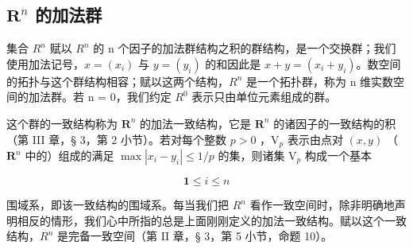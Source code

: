 \subsection{\texorpdfstring{\(\mathbf{R}^n\) 的加法群}{R 的 n 次幂的加法群}}

集合 \(R^{n}\) 赋以 \(R^{n}\) 的 n 个因子的加法群结构之积的群结构，是一个交换群；我们使用加法记号，\(x = (x_{i})\) 与 \(y = (y_{i})\) 的和因此是 \(x + y = (x_{i} + y_{i})\)。数空间的拓扑与这个群结构相容；赋以这两个结构，\(R^{n}\) 是一个拓扑群，称为 n 维实数空间的加法群。若 n = 0，我们约定 \(R^{0}\) 表示只由单位元素组成的群。

这个群的一致结构称为 \(\mathbf{R}^n\) 的加法一致结构，它是 \(\mathbf{R}^n\) 的诸因子的一致结构的积（第 III 章，§ 3，第 2 小节）。若对每个整数 \(p > 0\) ，\(\mathrm{V}_p\) 表示由点对 \((x, y)\) （\(\mathbf{R}^n\) 中的）组成的满足 \(\max |x_i - y_i| \leqslant 1/p\) 的集，则诸集 \(\mathrm{V}_p\) 构成一个基本

\[
\mathbf {1} \leqslant i \leqslant n
\]

围域系，即该一致结构的围域系。每当我们把 \(R^{n}\) 看作一致空间时，除非明确地声明相反的情形，我们心中所指的总是上面刚刚定义的加法一致结构。赋以这个一致结构，\(R^{n}\) 是完备一致空间（第 II 章，§ 3，第 5 小节，命题 10）。

